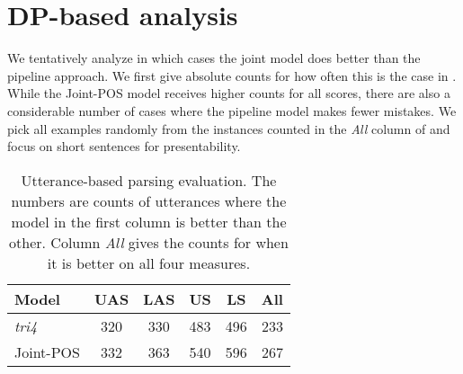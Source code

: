 \documentclass[11pt,letterpaper]{article}
\begin{document}
\section{DP-based analysis}\label{sec:dpa}
We tentatively analyze in which cases the joint model does better than the pipeline approach. We first give absolute counts for how often this is the case in . While the Joint-POS model receives higher counts for all scores, there are also a considerable number of cases where the pipeline model makes fewer mistakes. We pick all examples randomly from the instances counted in the \emph{All} column of  and focus on short sentences for presentability.
\begin{table}[h]
    \centering
    \begin{tabular}{@{}lccccc@{}}
        \toprule
        Model & UAS & LAS & US  & LS  & All \\ \midrule
        \emph{tri4}  & 320 & 330 & 483 & 496 & 233 \\
        Joint-POS    & 332 & 363 & 540 & 596 & 267 \\ \bottomrule
    \end{tabular}
    \caption{Utterance-based parsing evaluation. The numbers are counts of utterances where the model in the first column is better than the other. Column \emph{All} gives the counts for when it is better on all four measures.}
    \label{tab:better}
\end{table}
\end{document}
